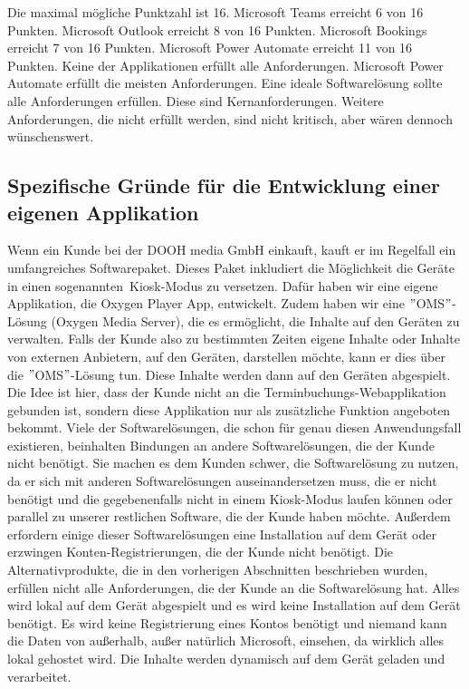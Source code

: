 \normalsize
\newline
\newline
Die maximal mögliche Punktzahl ist 16.
Microsoft Teams erreicht 6 von 16 Punkten.
Microsoft Outlook erreicht 8 von 16 Punkten.
Microsoft Bookings erreicht 7 von 16 Punkten.
Microsoft Power Automate erreicht 11 von 16 Punkten.
\newline
Keine der Applikationen erfüllt alle Anforderungen.
Microsoft Power Automate erfüllt die meisten Anforderungen.
Eine ideale Softwarelösung sollte alle Anforderungen erfüllen.
Diese sind Kernanforderungen.
Weitere Anforderungen, die nicht erfüllt werden, sind nicht kritisch, aber wären dennoch wünschenswert.
\newline
\newline
\subsection{Spezifische Gründe für die Entwicklung einer eigenen Applikation}\label{subsec:spezifische-grunde-fur-die-entwicklung-einer-eigenen-applikation}
Wenn ein Kunde bei der DOOH media GmbH einkauft, kauft er im Regelfall ein umfangreiches Softwarepaket.
Dieses Paket inkludiert die Möglichkeit die Geräte in einen sogenannten~\gls{Kiosk-Modus} zu versetzen.
Dafür haben wir eine eigene Applikation, die Oxygen Player App, entwickelt.
Zudem haben wir eine \("\)OMS\("\)-Lösung (Oxygen Media Server), die es ermöglicht, die Inhalte auf den Geräten zu verwalten.
Falls der Kunde also zu bestimmten Zeiten eigene Inhalte oder Inhalte von externen Anbietern, auf den Geräten, darstellen möchte, kann er dies über die \("\)OMS\("\)-Lösung tun.
Diese Inhalte werden dann auf den Geräten abgespielt.
\newline
Die Idee ist hier, dass der Kunde nicht an die Terminbuchungs-Webapplikation gebunden ist, sondern diese Applikation nur als zusätzliche Funktion angeboten bekommt.
Viele der Softwarelösungen, die schon für genau diesen Anwendungsfall existieren, beinhalten Bindungen an andere Softwarelösungen, die der Kunde nicht benötigt.
Sie machen es dem Kunden schwer, die Softwarelösung zu nutzen, da er sich mit anderen Softwarelösungen auseinandersetzen muss, die er nicht benötigt und die gegebenenfalls nicht in einem Kiosk-Modus laufen können oder parallel zu unserer restlichen Software, die der Kunde haben möchte.
Außerdem erfordern einige dieser Softwarelösungen eine Installation auf dem Gerät oder erzwingen Konten-Registrierungen, die der Kunde nicht benötigt.
\newline
Die Alternativprodukte, die in den vorherigen Abschnitten beschrieben wurden, erfüllen nicht alle Anforderungen, die der Kunde an die Softwarelösung hat.
Alles wird lokal auf dem Gerät abgespielt und es wird keine Installation auf dem Gerät benötigt.
Es wird keine Registrierung eines Kontos benötigt und niemand kann die Daten von außerhalb, außer natürlich Microsoft, einsehen, da wirklich alles lokal gehostet wird.
Die Inhalte werden dynamisch auf dem Gerät geladen und verarbeitet.
